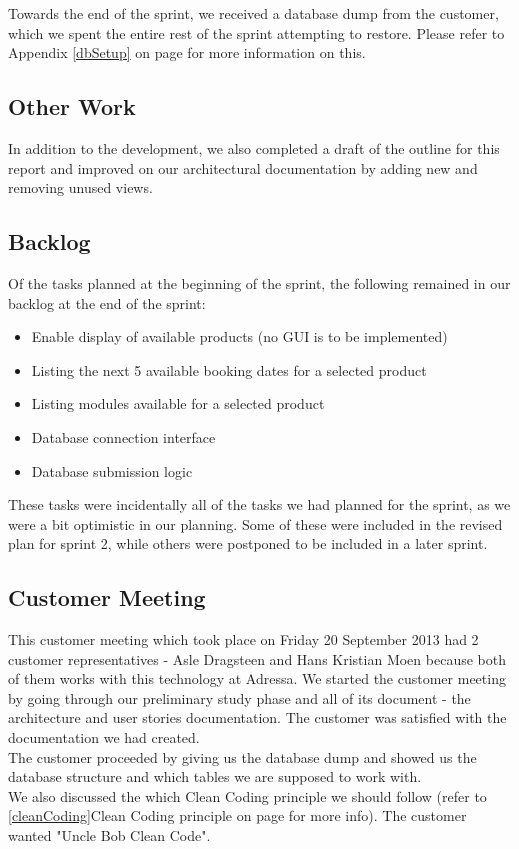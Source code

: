 Towards the end of the sprint, we received a database dump from the customer, which we spent the entire rest of the sprint attempting to restore. Please refer to Appendix \ref{dbSetup} on page \pageref{dbSetup} for more information on this.

\subsection{Other Work}
In addition to the development, we also completed a draft of the outline for this report and improved on our architectural documentation by adding new and removing unused views.

\subsection{Backlog}
Of the tasks planned at the beginning of the sprint, the following remained in our backlog at the end of the sprint:
\begin{itemize}
	\item Enable display of available products (no GUI is to be implemented)
	\item Listing the next 5 available booking dates for a selected product
	\item Listing modules available for a selected product
	\item Database connection interface
	\item Database submission logic
\end{itemize}

These tasks were incidentally all of the tasks we had planned for the sprint, as we were a bit optimistic in our planning. Some of these were included in the revised plan for sprint 2, while others were postponed to be included in a later sprint.

\subsection{Customer Meeting}
This customer meeting which took place on Friday 20 September 2013 had 2 customer representatives - Asle Dragsteen and Hans Kristian Moen because both of them works with this technology at Adressa. 
We started the customer meeting by going through our preliminary study phase and all of its document - the architecture and user stories documentation. The customer was satisfied with the documentation we had created.\\
The customer proceeded by giving us the database dump and showed us the database structure and which tables we are supposed to work with.\\
We also discussed the which Clean Coding principle we should follow (refer to \ref{cleanCoding}Clean Coding principle on page \pageref{cleanCoding} for more info). The customer wanted "Uncle Bob Clean Code".

